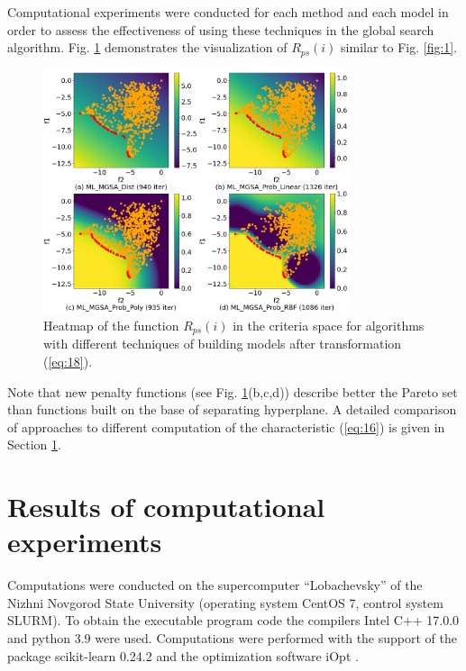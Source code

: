 \documentclass[runningheads]{llncs}
\begin{document}
Computational experiments were conducted for each method and each model in order to assess the effectiveness of using these techniques in the global search algorithm. Fig. \ref{fig:2} demonstrates the visualization of $R_{ps}(i)$ similar to Fig. \ref{fig:1}.
\begin{figure}
\centering
\includegraphics[width=0.8\textwidth]{fig2.png}
\caption{Heatmap of the function $R_{ps}(i)$ in the criteria space for algorithms with different techniques of building models after transformation (\ref{eq:18}).} 
\label{fig:2}
\end{figure}

Note that new penalty functions (see Fig. \ref{fig:2}(b,c,d)) describe better the Pareto set than functions built on the base of separating hyperplane. A detailed comparison of approaches to different computation of the characteristic (\ref{eq:16}) is given in Section \ref{sec:5}. 

\section{Results of computational experiments}
\label{sec:5}

Computations were conducted on the supercomputer ``Lobachevsky'' of the Nizhni Novgorod State University (operating system CentOS 7, control system SLURM). To obtain the executable program code the compilers Intel C++ 17.0.0 and python 3.9 were used. Computations were performed with the support of the package scikit-learn 0.24.2 and the optimization software iOpt \cite{iOpt_url}.
\end{document}
